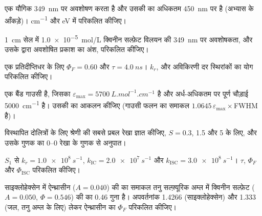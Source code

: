\begin{exercise}[$\star$]\label{exo:b3:electronic-spectroscopy:2}
एक यौगिक \qty{349}{nm} पर अवशोषण करता है और उसकी  का अधिकतम
\qty{450}{nm} पर है (अभ्यास के आँकड़े)।  \unit{cm^{-1}} और
eV में परिकलित कीजिए।
\end{exercise}

\begin{exercise}[$\star$]\label{exo:b3:electronic-spectroscopy:3}
\qty{1}{cm} सेल में \qty{1.0e-5}{mol/L} क्विनीन सल्फ़ेट विलयन की \qty{349}{nm} पर
अवशोषकता, और उसके द्वारा अवशोषित प्रकाश का अंश, परिकलित कीजिए।
\end{exercise}

\begin{exercise}[$\star$]\label{exo:b3:electronic-spectroscopy:4}
एक प्रतिदीप्तिधर के लिए $\Phi_F = 0.60$ और $\tau = \qty{4.0}{ns}$। $k_r$,
 और अविकिरणी दर स्थिरांकों का योग परिकलित कीजिए।
\end{exercise}

\begin{exercise}[$\star\star$]\label{exo:b3:electronic-spectroscopy:5}
एक बैंड गाउसी है, जिसका $\varepsilon_{\max} = \qty{5700}{L.mol^{-1}.cm^{-1}}$ है और
अर्ध-अधिकतम पर पूर्ण चौड़ाई \qty{5000}{cm^{-1}} है। उसकी  का आकलन कीजिए (गाउसी
फलन का समाकल $1.0645\,\varepsilon_{\max}\times$FWHM है)।
\end{exercise}

\begin{exercise}[$\star\star$]\label{exo:b3:electronic-spectroscopy:6}
विस्थापित दोलित्रों के लिए श्रेणी की सबसे प्रबल रेखा ज्ञात कीजिए,
$S = 0.3$, 1.5 और 5 के लिए, और उसके गुणक का 0--0 रेखा के गुणक से अनुपात।
\end{exercise}

\begin{exercise}[$\star\star$]\label{exo:b3:electronic-spectroscopy:7}
$S_1$ से $k_r = \qty{1.0e8}{s^{-1}}$, $k_{\mathrm{IC}} = \qty{2.0e7}{s^{-1}}$ और $k_{\mathrm{ISC}} =
\qty{3.0e8}{s^{-1}}$। $\tau$, $\Phi_F$ और $\Phi_{\mathrm{ISC}}$ परिकलित कीजिए।
\end{exercise}

\begin{exercise}[$\star\star$]\label{exo:b3:electronic-spectroscopy:8}
साइक्लोहेक्सेन में ऐन्थ्रासीन ($A = 0.040$) की  का समाकल तनु सल्फ़्यूरिक अम्ल में
क्विनीन सल्फ़ेट ($A = 0.050$, $\Phi =
0.546$) की  का 0.46 गुना है। अपवर्तनांक 1.4266 (साइक्लोहेक्सेन) और 1.333 (जल, तनु
अम्ल के लिए) लेकर ऐन्थ्रासीन का $\Phi_F$ परिकलित कीजिए।
\end{exercise}

